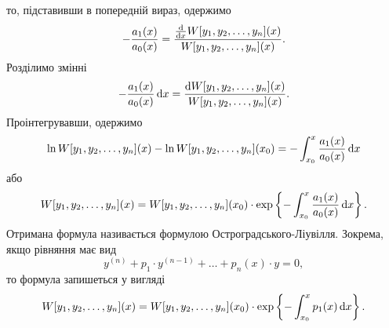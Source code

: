 то, підставивши в попередній вираз, одержимо
\begin{equation}
	\label{eq:3.1.32}
	- \frac{a_1(x)}{a_0(x)} = \frac{\frac{\mathop{}\!\mathrm{d}}{\mathop{}\!\mathrm{d} x} W[y_1, y_2, \ldots, y_n](x)}{W[y_1, y_2, \ldots, y_n](x)}.
\end{equation}
Розділимо змінні
\begin{equation}
	\label{eq:3.1.33}
	- \frac{a_1(x)}{a_0(x)} \mathop{}\!\mathrm{d} x = \frac{\mathop{}\!\mathrm{d} W[y_1, y_2, \ldots, y_n](x)}{W[y_1, y_2, \ldots, y_n](x)}.
\end{equation}
Проінтегрувавши, одержимо
\begin{equation}
	\label{eq:3.1.33}
	\ln W[y_1, y_2, \ldots, y_n](x) - \ln W[y_1, y_2, \ldots, y_n](x_0) = -\int_{x_0}^x \frac{a_1(x)}{a_0(x)} \mathop{}\!\mathrm{d} x
\end{equation}
або
\begin{equation}
	\label{eq:3.1.33}
	W[y_1, y_2, \ldots, y_n](x) = W[y_1, y_2, \ldots, y_n](x_0) \cdot \exp \left\{ -\int_{x_0}^x \frac{a_1(x)}{a_0(x)} \mathop{}\!\mathrm{d} x \right\}.
\end{equation}
Отримана формула називається формулою Остроградського-Ліувілля. Зокрема, якщо рівняння має вид
\begin{equation}
	\label{eq:3.1.34}
	y^{(n)} + p_1 \cdot y^{(n - 1)} + \ldots + p_n(x) \cdot y = 0,
\end{equation}
то формула запишеться у вигляді
\begin{equation}
	\label{eq:3.1.35}
	W[y_1, y_2, \ldots, y_n](x) = W[y_1, y_2, \ldots, y_n](x_0) \cdot \exp \left\{ -\int_{x_0}^x p_1(x) \mathop{}\!\mathrm{d} x \right\}.
\end{equation}
